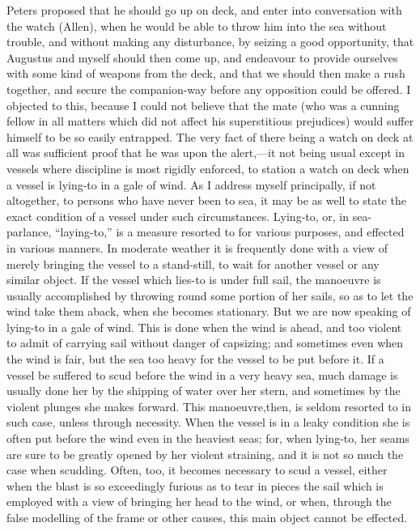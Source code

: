 Peters proposed that he should go up on deck, and enter into conversation
with the watch (Allen), when he would be able to throw him into the sea without
trouble, and without making any disturbance, by seizing a good opportunity, that
Augustus and myself should then come up, and endeavour to provide ourselves with
some kind of weapons from the deck, and that we should then make a rush
together, and secure the companion-way before any opposition could be offered. I
objected to this, because I could not believe that the mate (who was a cunning
fellow in all matters which did not affect his superstitious prejudices) would
suffer himself to be so easily entrapped. The very fact of there being a watch
on deck at all was sufficient proof that he was upon the alert,---it not being
usual except in vessels where discipline is most rigidly enforced, to station a
watch on deck when a vessel is lying-to in a gale of wind. As I address myself
principally, if not altogether, to persons who have never been to sea, it may be
as well to state the exact condition of a vessel under such circumstances.
Lying-to, or, in sea-parlance, ``laying-to,'' is a measure resorted to for various
purposes, and effected in various manners. In moderate weather it is frequently
done with a view of merely bringing the vessel to a stand-still, to wait for
another vessel or any similar object. If the vessel which lies-to is under full
sail, the manoeuvre is usually accomplished by throwing round some portion of
her sails, so as to let the wind take them aback, when she becomes stationary.
But we are now speaking of lying-to in a gale of wind. This is done when the
wind is ahead, and too violent to admit of carrying sail without danger of
capsizing; and sometimes even when the wind is fair, but the sea too heavy for
the vessel to be put before it. If a vessel be suffered to scud before the wind
in a very heavy sea, much damage is usually done her by the shipping of water
over her stern, and sometimes by the violent plunges she makes forward. This
manoeuvre,then, is seldom resorted to in such case, unless through necessity.
When the vessel is in a leaky condition she is often put before the wind even in
the heaviest seas; for, when lying-to, her seams are sure to be greatly opened
by her violent straining, and it is not so much the case when scudding. Often,
too, it becomes necessary to scud a vessel, either when the blast is so
exceedingly furious as to tear in pieces the sail which is employed with a view
of bringing her head to the wind, or when, through the false modelling of the
frame or other causes, this main object cannot be effected. 

